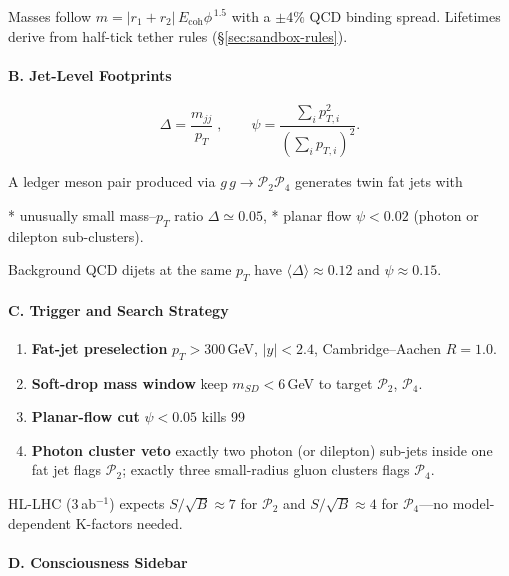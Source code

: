 \documentclass[11pt,oneside]{book}
\begin{document}
{Masses follow  
$m = |r_{1}+r_{2}|\,E_{\text{coh}}\phi^{\,1.5}$  
with a $\pm4\%$ QCD binding spread.
Lifetimes derive from half-tick tether rules
(\S\;\ref{sec:sandbox-rules}).

\paragraph*{B. Jet-Level Footprints}

\[
   \Delta = \frac{m_{jj}}{p_{T}} \;,\qquad
   \psi = \frac{\sum_{i}p_{T,i}^{2}}{(\sum_{i}p_{T,i})^{2}} .
\]

A ledger meson pair produced via
$g\,g\!\to\!\mathcal P_{2}\mathcal P_{4}$  
generates twin fat jets with

* unusually small mass–$p_{T}$ ratio $\Delta\simeq0.05$,  
* planar flow $\psi<0.02$ (photon or dilepton sub-clusters).

Background QCD dijets at the same $p_{T}$ have
$\langle\Delta\rangle\!\approx\!0.12$ and  
$\psi\!\approx\!0.15$.

\paragraph*{C. Trigger and Search Strategy}

\begin{enumerate}[label=\textbf{\arabic*.},leftmargin=1.25cm]
\item \textbf{Fat-jet preselection}  
      $p_{T}>300\,$GeV, $|y|<2.4$, Cambridge–Aachen $R=1.0$.
\item \textbf{Soft-drop mass window}  
      keep $m_{SD}\!<\!6\,$GeV to target $\mathcal P_{2}$, $\mathcal P_{4}$.
\item \textbf{Planar-flow cut}  
      $\psi<0.05$ kills 99 %
\item \textbf{Photon cluster veto}  
      exactly two photon (or dilepton) sub-jets inside one fat jet flags
      $\mathcal P_{2}$; exactly three small-radius gluon clusters flags
      $\mathcal P_{4}$.
\end{enumerate}

HL-LHC (3 ab\(^{-1}\)) expects  
$S/\sqrt B\!\approx\!7$ for $\mathcal P_{2}$ and  
$S/\sqrt B\!\approx\!4$ for $\mathcal P_{4}$—no model-dependent
K-factors needed.

\paragraph*{D. Consciousness Sidebar}

}
\end{document}
